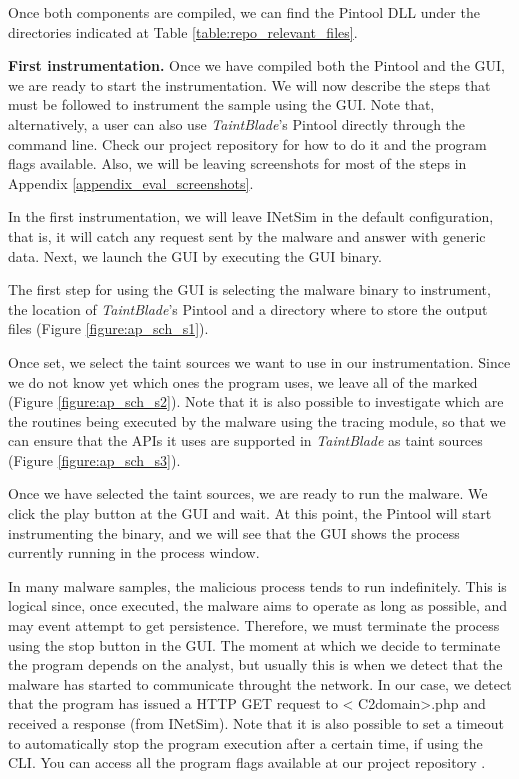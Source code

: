 \documentclass[conference]{IEEEtran}
\begin{document}
Once both components are compiled, we can find the Pintool DLL under the
directories indicated at Table \ref{table:repo_relevant_files}.

\textbf{First instrumentation.}
Once we have compiled both the Pintool and the GUI, we are ready to start the instrumentation. We will
now describe the steps that must be followed to instrument the sample using the GUI. Note that, alternatively,
a user can also use \textit{TaintBlade}'s Pintool directly through the command line. Check our project repository for
how to do it and the program flags available. Also, we will be leaving screenshots for most of the steps in
Appendix \ref{appendix_eval_screenshots}.

In the first instrumentation, we will leave INetSim in the default
configuration, that is, it will catch any request sent by the malware and
answer with generic data. Next, we launch the GUI by executing the GUI binary.

The first step for using the GUI is selecting the malware binary to instrument,
the location of \textit{TaintBlade}'s Pintool and a directory where to store
the output files (Figure \ref{figure:ap_sch_s1}).

Once set, we select the taint sources we want to use in our instrumentation.
Since we do not know yet which ones the program uses, we leave all of the
marked (Figure \ref{figure:ap_sch_s2}). Note that it is also possible to
investigate which are the routines being executed by the malware using the
tracing module, so that we can ensure that the APIs it uses are supported in
\textit{TaintBlade} as taint sources (Figure \ref{figure:ap_sch_s3}).

Once we have selected the taint sources, we are ready to run the malware. We
click the play button at the GUI and wait. At this point, the Pintool will
start instrumenting the binary, and we will see that the GUI shows the process
currently running in the process window.

In many malware samples, the malicious process tends to run indefinitely. 
This is logical since, once executed, the malware aims to
operate as long as possible, and may event attempt to get persistence. Therefore,
we must terminate the process using the stop button in the GUI. The moment at which
we decide to terminate the program depends on the analyst, but usually this is when
we detect that the malware has started to communicate throught the network. In
our case, we detect that the program has issued a HTTP GET request to \textless
C2domain\textgreater.php and received a response (from INetSim). Note that it is 
also possible to set a timeout to automatically stop the program execution after
a certain time, if using the CLI. You can access all the program flags available 
at our project repository .
\end{document}
